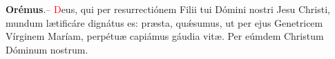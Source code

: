 
\vspace{1mm}


\vspace{1mm}


\vspace{1mm}

\textbf{Orémus}.-- \textcolor{red}{D}eus, qui per resurrectiónem Filii tui Dómini nostri Jesu Christi,
mundum l{\ae}tificáre dignátus es: pr{\ae}sta, qu{\'\ae}sumus, ut per ejus Genetricem Vírginem Maríam,
perpétu{\ae} capiámus gáudia vit{\ae}. Per eúmdem Christum Dóminum nostrum.  
